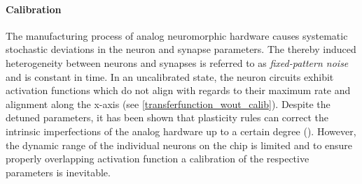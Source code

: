 

%
%
\paragraph{Calibration}\label{calibration}
The manufacturing process of analog neuromorphic hardware causes systematic stochastic deviations in the neuron and synapse parameters. The thereby induced heterogeneity between neurons and synapses is referred to as \emph{fixed-pattern noise} and is constant in time. In an uncalibrated state, the neuron circuits exhibit activation functions which do not align with regards to their maximum rate and alignment along the x-axis (see \cref{transferfunction_wout_calib}). Despite the detuned parameters, it has been shown that plasticity rules can correct the intrinsic imperfections of the analog hardware up to a certain degree (\citealp{wunderlich2019advantages}). However, the dynamic range of the individual neurons on the chip is limited and to ensure properly overlapping activation function a calibration of the respective parameters is inevitable.

